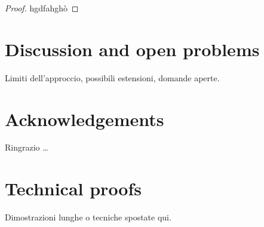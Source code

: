 \documentclass[11pt,a4paper]{article}
\theoremstyle{plain}
\theoremstyle{definition}
\begin{document}
\begin{proof}

	hgdfahghò
\end{proof}


\section{Discussion and open problems}
\label{sec:discussion}

Limiti dell'approccio, possibili estensioni, domande aperte.

\section*{Acknowledgements}
Ringrazio \dots


\appendix
\section{Technical proofs}
\label{app:proofs}

Dimostrazioni lunghe o tecniche spostate qui.
\end{document}

